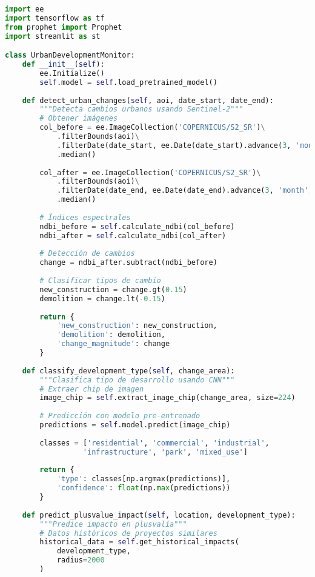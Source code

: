 \documentclass[12pt,a4paper]{article}
\begin{document}
\begin{lstlisting}[language=Python, caption=Detección de cambios urbanos y predicción de plusvalía]
import ee
import tensorflow as tf
from prophet import Prophet
import streamlit as st

class UrbanDevelopmentMonitor:
    def __init__(self):
        ee.Initialize()
        self.model = self.load_pretrained_model()
        
    def detect_urban_changes(self, aoi, date_start, date_end):
        """Detecta cambios urbanos usando Sentinel-2"""
        # Obtener imágenes
        col_before = ee.ImageCollection('COPERNICUS/S2_SR')\
            .filterBounds(aoi)\
            .filterDate(date_start, ee.Date(date_start).advance(3, 'month'))\
            .median()
            
        col_after = ee.ImageCollection('COPERNICUS/S2_SR')\
            .filterBounds(aoi)\
            .filterDate(date_end, ee.Date(date_end).advance(3, 'month'))\
            .median()
        
        # Índices espectrales
        ndbi_before = self.calculate_ndbi(col_before)
        ndbi_after = self.calculate_ndbi(col_after)
        
        # Detección de cambios
        change = ndbi_after.subtract(ndbi_before)
        
        # Clasificar tipos de cambio
        new_construction = change.gt(0.15)
        demolition = change.lt(-0.15)
        
        return {
            'new_construction': new_construction,
            'demolition': demolition,
            'change_magnitude': change
        }
    
    def classify_development_type(self, change_area):
        """Clasifica tipo de desarrollo usando CNN"""
        # Extraer chip de imagen
        image_chip = self.extract_image_chip(change_area, size=224)
        
        # Predicción con modelo pre-entrenado
        predictions = self.model.predict(image_chip)
        
        classes = ['residential', 'commercial', 'industrial', 
                  'infrastructure', 'park', 'mixed_use']
        
        return {
            'type': classes[np.argmax(predictions)],
            'confidence': float(np.max(predictions))
        }
    
    def predict_plusvalue_impact(self, location, development_type):
        """Predice impacto en plusvalía"""
        # Datos históricos de proyectos similares
        historical_data = self.get_historical_impacts(
            development_type, 
            radius=2000
        )
        

\end{lstlisting}
\end{document}
